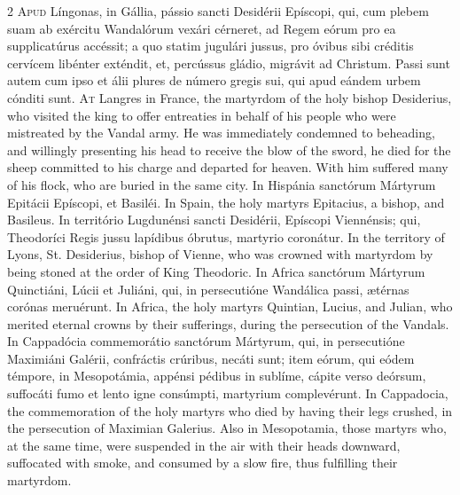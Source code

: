 \begin{paracol}{2}
\lettrine[lines=2]{A}{pud} Língonas, in 
 Gállia, pássio sancti Desidérii Epíscopi, qui, cum plebem suam ab exércitu 
 Wandalórum vexári cérneret, ad Regem eórum pro ea supplicatúrus accéssit; a 
 quo statim jugulári jussus, pro óvibus sibi créditis cervícem libénter 
 exténdit, et, percússus gládio, migrávit ad Christum. Passi sunt autem 
 cum ipso et álii plures de número gregis sui, qui apud eándem urbem cónditi 
 sunt.
\switchcolumn
{}
\lettrine[lines=2]{A}{t} Langres in France, the martyrdom 
 of the holy bishop Desiderius, who visited the king to offer entreaties in 
 behalf of his people who were mistreated by the Vandal army. He was 
 immediately condemned to beheading, and willingly presenting his head to 
 receive the blow of the sword, he died for the sheep committed to his charge 
 and departed for heaven. With him suffered many of his flock, who are 
 buried in the same city.
\switchcolumn*
{}
In Hispánia sanctórum 
 Mártyrum Epitácii Epíscopi, et Basiléi.
\switchcolumn
{}
In Spain, the holy martyrs 
 Epitacius, a bishop, and Basileus.
\switchcolumn*
{}
In território 
 Lugdunénsi sancti Desidérii, Epíscopi Viennénsis; qui, Theodoríci Regis 
 jussu lapídibus óbrutus, martyrio coronátur.
\switchcolumn
{}
In the territory of Lyons, St. 
 Desiderius, bishop of Vienne, who was crowned with martyrdom by being 
 stoned at the order of King Theodoric.
\switchcolumn*
{}
In Africa sanctórum 
 Mártyrum Quinctiáni, Lúcii et Juliáni, qui, in persecutióne Wandálica passi, 
 ætérnas corónas meruérunt.
\switchcolumn
{}
In Africa, the holy martyrs 
 Quintian, Lucius, and Julian, who merited eternal crowns by their 
 sufferings, during the persecution of the Vandals.
\switchcolumn*
{}
In Cappadócia 
 commemorátio sanctórum Mártyrum, qui, in persecutióne Maximiáni Galérii, 
 confráctis crúribus, necáti sunt; item eórum, qui eódem témpore, in 
 Mesopotámia, appénsi pédibus in sublíme, cápite verso deórsum, suffocáti 
 fumo et lento igne consúmpti, martyrium complevérunt.
\switchcolumn
{}
In Cappadocia, the commemoration of 
 the holy martyrs who died by having their legs crushed, in the persecution 
 of Maximian Galerius. Also in Mesopotamia, those martyrs who, at the 
 same time, were suspended in the air with their heads downward, suffocated 
 with smoke, and consumed by a slow fire, thus fulfilling their martyrdom.

\end{paracol}
